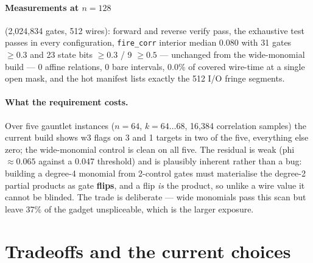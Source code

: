 \documentclass[11pt]{article}
\newcommand{\doc}[1]{\texttt{#1}}
\begin{document}
\paragraph{Measurements at $n=128$} (2,024,834 gates, 512 wires): forward and reverse verify
pass, the exhaustive test passes in every configuration, \doc{fire\_corr} interior median 0.080
with 31 gates $\ge0.3$ and 23 state bits $\ge0.3$ / 9 $\ge0.5$ --- unchanged from the
wide-monomial build --- 0 affine relations, 0 bare intervals, 0.0\% of covered wire-time at a
single open mask, and the hot manifest lists exactly the 512 I/O fringe segments.

\paragraph{What the requirement costs.} Over five gauntlet instances ($n=64$, $k=64\ldots68$,
16,384 correlation samples) the current build shows w3 flags on 3 and 1 targets in two of the
five, everything else zero; the wide-monomial control is clean on all five. The residual is weak
(phi ${\approx}0.065$ against a 0.047 threshold) and is plausibly inherent rather than a bug:
building a degree-4 monomial from 2-control gates must materialise the degree-2 partial products
as gate \textbf{flips}, and a flip \emph{is} the product, so unlike a wire value it cannot be
blinded. The trade is deliberate --- wide monomials pass this scan but leave 37\% of the gadget
unspliceable, which is the larger exposure.


\section{Tradeoffs and the current choices}
\end{document}
